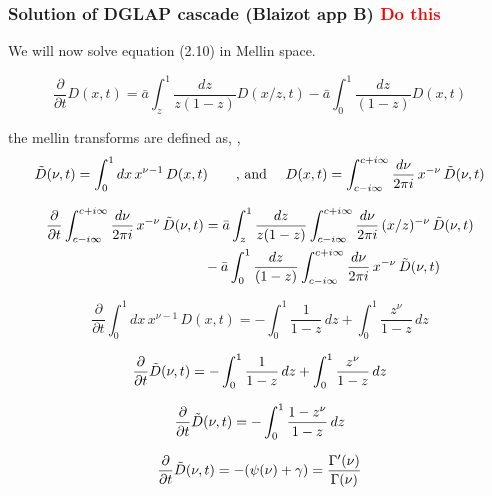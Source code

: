\documentclass[main.tex]{subfiles}
\begin{document}
\subsubsection{Solution of DGLAP cascade (Blaizot app B) \textcolor{red}{Do this}}
We will now solve equation (2.10) in Mellin space.

\begin{equation}\label{eqn: blaizot_2.10}
    \frac{\partial}{\partial t} D(x,t) = \bar a \int_z^1 \frac{dz}{z(1-z)} D(x/z,t) - \bar a \int_0^1 \frac{dz}{(1-z)} D(x,t)
\end{equation}

the mellin transforms are defined as, \cite{Energy_flow_medium_cascade_2016},
\begin{equation*}\label{eqn: mellin_transforms}
    \Tilde{D}(\nu, t) = \int_0^1 dx\, x^{\nu-1} \, D(x,t) \qquad \text{, and }\quad D(x,t) = \int_{c-i\infty}^{c+i\infty} \frac{d\nu}{2\pi i}\, x^{-\nu} \, \Tilde{D}(\nu, t)
\end{equation*}

\begin{align*}
    \frac{\partial}{\partial t} \int_{c-i\infty}^{c+i\infty} \frac{d\nu}{2\pi i}\, x^{-\nu} \, \Tilde{D}(\nu, t) &= \bar a \int_z^1 \frac{dz}{z(1-z)} \int_{c-i\infty}^{c+i\infty} \frac{d\nu}{2\pi i}\, (x/z)^{-\nu} \, \Tilde{D}(\nu, t) \\
    &- \bar a \int_0^1 \frac{dz}{(1-z)} \int_{c-i\infty}^{c+i\infty} \frac{d\nu}{2\pi i}\, x^{-\nu} \, \Tilde{D}(\nu, t)
\end{align*}

\begin{equation*}
    \frac{\partial}{\partial t} \int_0^1 dx\, x^{\nu-1} \, D(x,t) = -\int_0^1 \frac{1}{1-z}\, dz +\int_0^1 \frac{z^\nu}{1-z}\, dz 
\end{equation*}


\begin{equation*}
    \frac{\partial}{\partial t} \Tilde{D}(\nu, t) = -\int_0^1 \frac{1}{1-z}\, dz +\int_0^1 \frac{z^\nu}{1-z}\, dz 
\end{equation*}

\begin{equation*}
    \frac{\partial}{\partial t} \Tilde{D}(\nu, t) = -\int_0^1 \frac{1-z^\nu}{1-z}\, dz 
\end{equation*}

\begin{equation*}
    \frac{\partial}{\partial t} \Tilde{D}(\nu, t) = -(\psi(\nu)+\gamma) = \frac{\Gamma'(\nu)}{\Gamma(\nu)}
\end{equation*}
\end{document}
